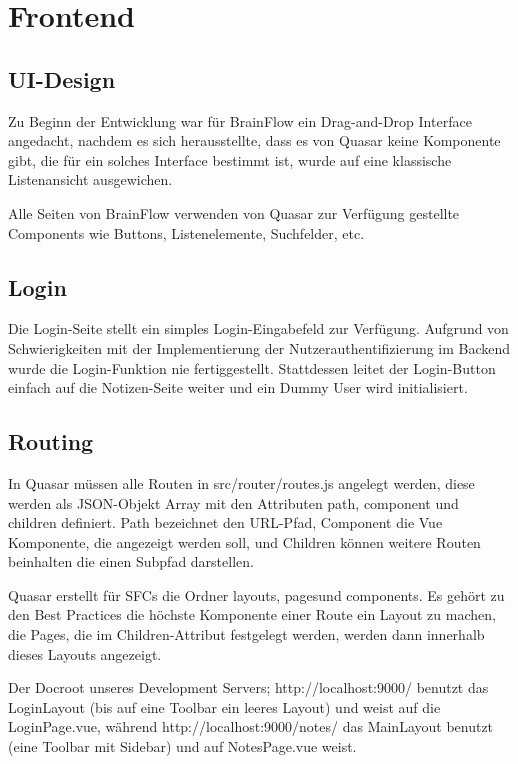 \section{Frontend}
    \subsection{UI-Design}
    Zu Beginn der Entwicklung war für BrainFlow ein Drag-and-Drop Interface angedacht, nachdem es sich herausstellte, dass es von Quasar keine Komponente gibt, die für
    ein solches Interface bestimmt ist, wurde auf eine klassische Listenansicht ausgewichen.
    
    \bigskip\noindent
    Alle Seiten von BrainFlow verwenden von Quasar zur Verfügung gestellte Components wie Buttons, Listenelemente, Suchfelder, etc.

    \subsection{Login}
        Die Login-Seite stellt ein simples Login-Eingabefeld zur Verfügung. Aufgrund von Schwierigkeiten mit der Implementierung der Nutzerauthentifizierung im Backend
        wurde die Login-Funktion nie fertiggestellt. Stattdessen leitet der Login-Button einfach auf die Notizen-Seite weiter und ein Dummy User wird initialisiert.

    \subsection{Routing}
        In Quasar müssen alle Routen in src/router/routes.js angelegt werden, diese werden als JSON-Objekt Array mit den Attributen path, component und children definiert.
        Path bezeichnet den URL-Pfad, Component die Vue Komponente, die angezeigt werden soll, und Children können weitere Routen beinhalten die einen Subpfad darstellen.
        
        \bigskip\noindent
        Quasar erstellt für SFCs die Ordner \flqq layouts\frqq, \flqq pages\frqq und \flqq components\frqq. Es gehört zu den Best Practices die höchste Komponente einer Route ein
        Layout zu machen, die Pages, die im Children-Attribut festgelegt werden, werden dann innerhalb dieses Layouts angezeigt.
        
        \bigskip\noindent
        Der Docroot unseres Development Servers; http://localhost:9000/ benutzt das LoginLayout (bis auf eine Toolbar ein leeres Layout) und weist auf die LoginPage.vue,
        während http://localhost:9000/notes/ das MainLayout benutzt (eine Toolbar mit Sidebar) und auf NotesPage.vue weist.
    
